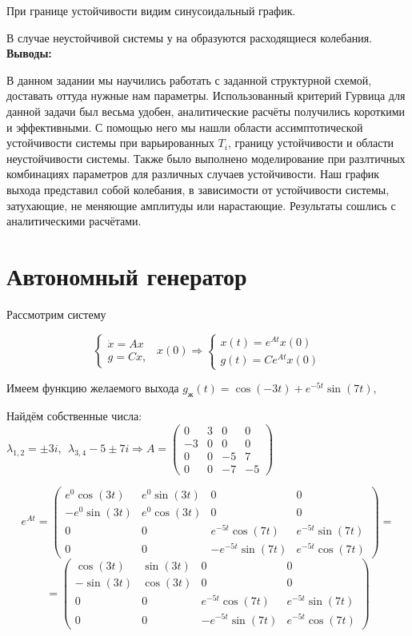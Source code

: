 При границе устойчивости видим синусоидальный график.

В случае неустойчивой системы у на образуются расходящиеся колебания.
\\


\textbf{Выводы:}


В данном задании мы научились работать с заданной структурной схемой, доставать оттуда нужные нам параметры. Использованный критерий Гурвица для данной задачи был весьма удобен, аналитические расчёты получились короткими и эффективными. С помощью него мы нашли области ассимптотической устойчивости системы при варьированных $T_i$, границу устойчивости и области неустойчивости системы. Также было выполнено моделирование при разлтичных комбинациях параметров для различных случаев устойчивости. Наш график выхода представил собой колебания, в зависимости от устойчивости системы, затухающие, не меняющие амплитуды или нарастающие. Результаты сошлись с аналитическими расчётами.


\section{Автономный генератор}


Рассмотрим систему


\begin{par}
$$\left\lbrace \begin{array}{c}
\dot{x} =Ax\\
g=Cx,
\end{array}\right.~~x(0)\Rightarrow \left\lbrace \begin{array}{c}
x(t)=e^{At} x(0)\\
g(t)=Ce^{At} x(0)
\end{array}\right.$$
\end{par}


Имеем функцию желаемого выхода $g_ж (t)=\cos (-3t)+e^{-5t} \sin (7t)$,



Найдём собственные числа: $\lambda_{1,2} =\pm 3i,~~\lambda_{3,4} -5\pm 7i\Rightarrow A=\left(\begin{array}{cccc}
0 & 3 & 0 & 0\\
-3 & 0 & 0 & 0\\
0 & 0 & -5 & 7\\
0 & 0 & -7 & -5
\end{array}\right)$


$$e^{At} =\left(\begin{array}{cccc}
e^0 \cos (3t) & e^0 \sin (3t) & 0 & 0\\
-e^0 \sin (3t) & e^0 \cos (3t) & 0 & 0\\
0 & 0 & e^{-5t} \cos (7t) & e^{-5t} \sin (7t)\\
0 & 0 & -e^{-5t} \sin (7t) & e^{-5t} \cos (7t)
\end{array}\right)=$$
$$
=\left(\begin{array}{cccc}
\cos (3t) & \sin (3t) & 0 & 0\\
-\sin (3t) & \cos (3t) & 0 & 0\\
0 & 0 & e^{-5t} \cos (7t) & e^{-5t} \sin (7t)\\
0 & 0 & -e^{-5t} \sin (7t) & e^{-5t} \cos (7t)
\end{array}\right)
$$


